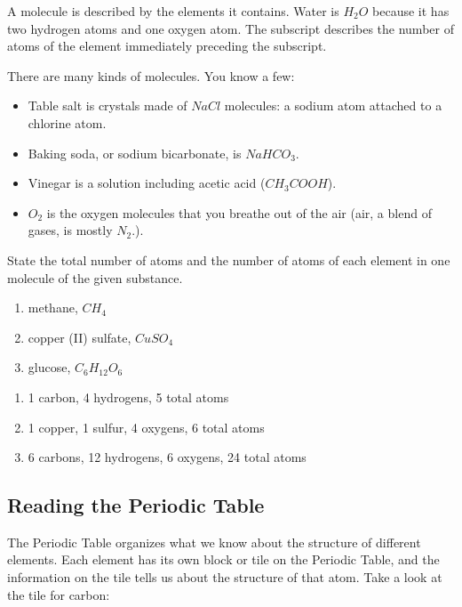 A molecule is described by the elements it contains. Water is $H_2O$
because it has two hydrogen atoms and one oxygen atom. The subscript describes 
the number of atoms of the element immediately preceding the subscript. 

There are many kinds of molecules. You know a few:
\begin{itemize}
\item Table salt is crystals made of $NaCl$ molecules: a sodium atom attached 
to a chlorine atom.
\item Baking soda, or sodium bicarbonate, is $NaHCO_3$.
\item Vinegar is a solution including acetic acid ($CH_3COOH$).
\item $O_2$ is the oxygen molecules that you breathe out of the air (air, a 
blend of gases, is mostly $N_2$.).
\end{itemize}

\begin{Exercise}[title = {Numbers of Atoms in Molecules}, label = num_atom]
State the total number of atoms and the number of atoms of each element in one 
molecule of the given substance.
\begin{enumerate}
\item methane, $CH_4$
\item copper (II) sulfate, $CuSO_4$
\item glucose, $C_6H_{12}O_6$
\end{enumerate}
\end{Exercise}

\begin{Answer}[ref = num_atom]
\begin{enumerate}
\item 1 carbon, 4 hydrogens, 5 total atoms
\item 1 copper, 1 sulfur, 4 oxygens, 6 total atoms
\item 6 carbons, 12 hydrogens, 6 oxygens, 24 total atoms
\end{enumerate}
\end{Answer}

\subsection{Reading the Periodic Table}
The Periodic Table organizes what we know about the structure of different
elements. Each element has its own block or tile on the Periodic Table, and the
information on the tile tells us about the structure of that atom. Take a look at
the tile for carbon:

